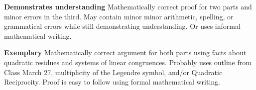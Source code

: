 \documentclass[letterpaper, 11pt]{ximera}
\begin{document}
\begin{ex}
\begin{writeRubric}
    \item \textbf{Demonstrates understanding} Mathematically correct proof for two parts and minor errors in the third. May contain minor minor arithmetic, spelling, or grammatical errors while still demonstrating understanding. Or uses informal mathematical writing.
    
    \item \textbf{Exemplary} Mathematically correct argument for both parts using facts about quadratic residues and systems of linear congruences. Probably uses outline from Class March 27, multiplicity of the Legendre symbol, and/or Quadratic Reciprocity. Proof is easy to follow using formal mathematical writing.
        
\end{writeRubric}
\end{ex}
\end{document}
